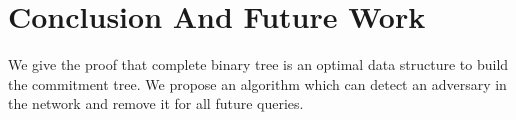 \chapter{Conclusion And Future Work} 
\label{cha:conclusion}

	We give the proof that complete binary tree is an optimal data structure to build the commitment tree.
	We propose an algorithm which can detect an adversary in the network and remove it for all future queries.
